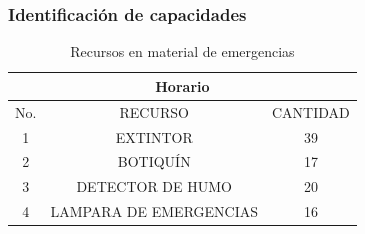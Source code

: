     \subsubsection{Identificación de capacidades}
    \begin{table}[h]
        \centering
        \begin{tabular}{|c|c|c|}
        \hline
        \multicolumn{3}{c}{Horario}\\
        \hline
             No.& RECURSO& CANTIDAD \\
        \hline
             1 & EXTINTOR & 39\\
        \hline
             2 & BOTIQUÍN & 17\\
        \hline 
             3 & DETECTOR DE HUMO & 20\\
        \hline
             4 & LAMPARA DE EMERGENCIAS & 16\\
             \hline
        \end{tabular}
        \caption{Recursos en material de emergencias}
        \label{tab:riego}
    \end{table}
